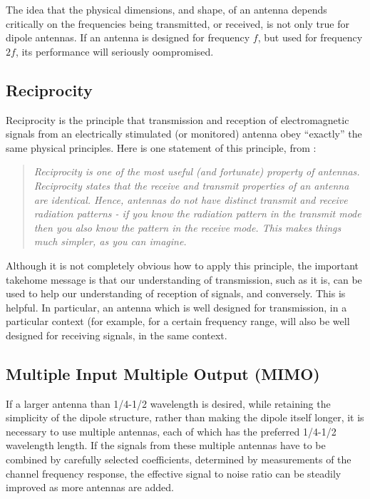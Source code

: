 The idea that the physical dimensions, and shape, of an antenna depends critically on the
frequencies being transmitted, or received, is not only true for dipole antennas. If an antenna
is designed for frequency $f$, but used for frequency $2f$, its performance will seriously
oompromised.

\subsection{Reciprocity}

Reciprocity is the principle that transmission and reception of electromagnetic signals
from an electrically stimulated (or monitored) antenna obey ``exactly'' the same physical
principles. Here is one statement of this principle, from \cite{antennatheory}:
\begin{quote}\em
Reciprocity is one of the most useful (and fortunate) property of
antennas. Reciprocity states that the receive and transmit properties of
an antenna are identical. Hence, antennas do not have distinct transmit
and receive radiation patterns - if you know the radiation pattern in the
transmit mode then you also know the pattern in the receive mode. This
makes things much simpler, as you can imagine.  
\end{quote}

Although it is not completely obvious how to apply this principle, the important
takehome message is that our understanding of transmission, such as it is,
can be used to help our understanding of reception of signals, and conversely.
This is helpful. In particular, an antenna which is well designed for transmission,
in a particular context (for example, for a certain frequency range, will also be well designed for receiving signals, in the
same context.

\subsection{Multiple Input Multiple Output (MIMO)}\label{mimo}

If a larger antenna than 1/4-1/2 wavelength is desired, while retaining the simplicity of the
dipole structure, rather than making the dipole itself longer, it is necessary to use multiple
antennas, each of which has the preferred 1/4-1/2 wavelength length. If the signals from these
multiple antennas have to be combined by carefully selected coefficients, determined by measurements
of the channel frequency response, the effective signal to noise ratio can be steadily improved
as more antennas are added. 

